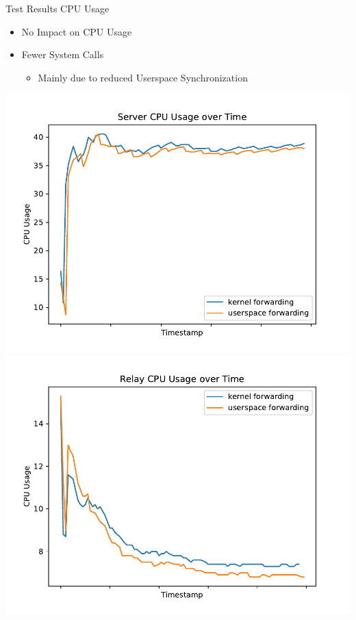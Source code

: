 \documentclass[shortpres,aspectratio=43]{beamer}
\newlength{\mylength}
\begin{document}
\begin{frame}{Test Results CPU Usage}
    \begin{minipage}{0.4\textwidth}
        \begin{itemize}
            \item No Impact on CPU Usage
            \vspace{2\mylength}
            \item Fewer System Calls
            \vspace{2\mylength}
            \begin{itemize}
                \item Mainly due to reduced Userspace Synchronization
            \end{itemize}
        \end{itemize}
    \end{minipage}\hfill
    \begin{minipage}{0.58\textwidth}
        \includegraphics[scale=0.21]{../figures/04_testing_and_results/cpu_usage_server_ns.pdf}
        \includegraphics[scale=0.21]{../figures/04_testing_and_results/cpu_usage_relay_ns.pdf}

\end{minipage}
\end{frame}
\end{document}
